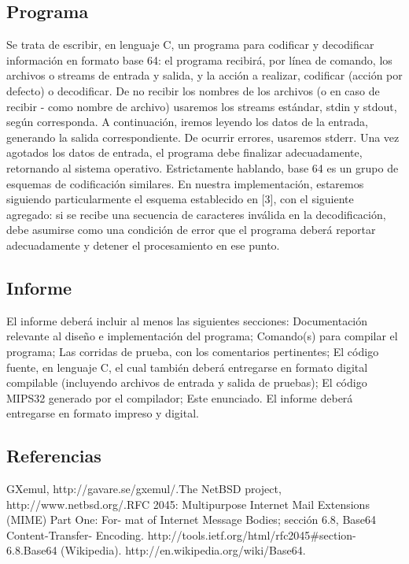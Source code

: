 \documentclass[a4paper,11pt, margin=1in]{article}
\begin{document}
\subsection{Programa}
Se trata de escribir, en lenguaje C, un programa para codificar y decodificar
información en formato base 64: el programa recibirá, por línea de comando, los archivos o streams de entrada y salida, y la acción a realizar, codificar (acción por defecto) o decodificar. De no recibir los nombres de los archivos (o
en caso de recibir - como nombre de archivo) usaremos los streams estándar,
stdin y stdout, según corresponda. A continuación, iremos leyendo los datos
de la entrada, generando la salida correspondiente. De ocurrir errores, usaremos stderr. Una vez agotados los datos de entrada, el programa debe finalizar
adecuadamente, retornando al sistema operativo.
Estrictamente hablando, base 64 es un grupo de esquemas de codificación
similares. En nuestra implementación, estaremos siguiendo particularmente el
esquema establecido en [3], con el siguiente agregado: si se recibe una secuencia
de caracteres inválida en la decodificación, debe asumirse como una condición
de error que el programa deberá reportar adecuadamente y detener el procesamiento en ese punto.

\subsection{Informe}
El informe deberá incluir al menos las siguientes secciones:
Documentación relevante al diseño e implementación del programa;
Comando(s) para compilar el programa;
Las corridas de prueba, con los comentarios pertinentes;
El código fuente, en lenguaje C, el cual también deberá entregarse en
formato digital compilable (incluyendo archivos de entrada y salida de
pruebas);
El código MIPS32 generado por el compilador;
Este enunciado.
El informe deberá entregarse en formato impreso y digital.

\subsection{Referencias}
\begin{flushleft}
[1] GXemul, http://gavare.se/gxemul/.\break
[2] The NetBSD project, http://www.netbsd.org/.\break
[3] RFC 2045: Multipurpose Internet Mail Extensions (MIME) Part One: For-
mat of Internet Message Bodies; sección 6.8, Base64 Content-Transfer-
Encoding. http://tools.ietf.org/html/rfc2045\#section-6.8.\break
[4] Base64 (Wikipedia). http://en.wikipedia.org/wiki/Base64.
\end{flushleft}
\end{document}
